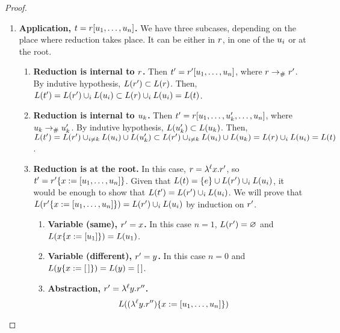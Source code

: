 \begin{proof}
\begin{enumerate}
\item {\bf Application, $t = r [u_1, \hdots, u_n]$.}
  We have three subcases, depending on the place where reduction takes place.
  It can be either in $r$, in one of the $u_i$ or at the root.
  \begin{enumerate}
    \item {\bf Reduction is internal to $r$.}
      Then $t' = r' [u_1, \hdots, u_n]$, where $r \mathrel{\to_{\mathtt{\#}}} r'$.
      By indutive hypothesis, $L(r') \subset L(r)$.
      Then,
        $L(t') = L(r') \cup_i L(u_i) \subset L(r) \cup_i L(u_i) = L(t)$.
    \item {\bf Reduction is internal to $u_k$.}
      Then $t' = r [u_1, \hdots, u_k', \hdots, u_n]$,
        where $u_k \mathrel{\to_{\mathtt{\#}}} u_k'$.
      By indutive hypothesis, $L(u_k') \subset L(u_k)$.
      Then,
        $L(t') = L(r') \cup_{i\neq k} L(u_i) \cup L(u_k')
           \subset L(r') \cup_{i\neq k} L(u_i) \cup L(u_k)
                 = L(r) \cup_i L(u_i) = L(t)$.
    \item {\bf Reduction is at the root.} In this case, $r = \lambda^{\ell} x. r'$,
      so $t' = r'\{x := [u_1, \hdots, u_n]\}$.
      Given that $L(t) = \{e\} \cup L(r') \cup_i L(u_i)$, it would be enough
        to show that $L(t') = L(r') \cup_i L(u_i)$.
      We will prove that
        $L(r'\{x := [u_1, \hdots, u_n]\}) =
         L(r') \cup_i L(u_i)$ by induction on $r'$.
      \begin{enumerate}
        \item {\bf Variable (same), $r' = x$.}
          In this case $n = 1$, $L(r') = \varnothing$ and
          $L(x\{x := [u_1]\}) = L(u_1)$.
        \item {\bf Variable (different), $r' = y$.}
          In this case $n = 0$ and
          $L(y\{x := [\,]\}) = L(y) = [\,]$.
        \item {\bf Abstraction, $r' = \lambda^{\ell} y. r''$.}
        \begin{equation*}\begin{split}
          L(\subs{(\lamp{\lab}{\vartwo}{\tmfour''})}{\var}{\lset{\tmthree_1, \hdots, \tmthree_n}}) &

\end{split}
\end{equation*}
\end{enumerate}
\end{enumerate}
\end{enumerate}
\end{proof}
